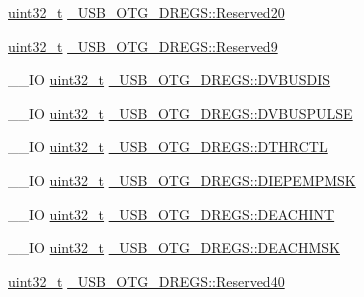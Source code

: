 \begin{DoxyCompactItemize}
\item 
\hyperlink{stdint_8h_a435d1572bf3f880d55459d9805097f62}{uint32\-\_\-t} \hyperlink{group___u_s_b___o_t_g___d_r_i_v_e_r_gaced158adced10fd701d0f38a199029c9}{\-\_\-\-U\-S\-B\-\_\-\-O\-T\-G\-\_\-\-D\-R\-E\-G\-S\-::\-Reserved20}
\item 
\hyperlink{stdint_8h_a435d1572bf3f880d55459d9805097f62}{uint32\-\_\-t} \hyperlink{group___u_s_b___o_t_g___d_r_i_v_e_r_gaa9a82782dd99d04af4174820c8266bcc}{\-\_\-\-U\-S\-B\-\_\-\-O\-T\-G\-\_\-\-D\-R\-E\-G\-S\-::\-Reserved9}
\item 
\-\_\-\-\_\-\-I\-O \hyperlink{stdint_8h_a435d1572bf3f880d55459d9805097f62}{uint32\-\_\-t} \hyperlink{group___u_s_b___o_t_g___d_r_i_v_e_r_ga818ba565032fe67ebe18f4e97ce4b379}{\-\_\-\-U\-S\-B\-\_\-\-O\-T\-G\-\_\-\-D\-R\-E\-G\-S\-::\-D\-V\-B\-U\-S\-D\-I\-S}
\item 
\-\_\-\-\_\-\-I\-O \hyperlink{stdint_8h_a435d1572bf3f880d55459d9805097f62}{uint32\-\_\-t} \hyperlink{group___u_s_b___o_t_g___d_r_i_v_e_r_gac962d74d4a9c6a4e0741c0b0854d9c09}{\-\_\-\-U\-S\-B\-\_\-\-O\-T\-G\-\_\-\-D\-R\-E\-G\-S\-::\-D\-V\-B\-U\-S\-P\-U\-L\-S\-E}
\item 
\-\_\-\-\_\-\-I\-O \hyperlink{stdint_8h_a435d1572bf3f880d55459d9805097f62}{uint32\-\_\-t} \hyperlink{group___u_s_b___o_t_g___d_r_i_v_e_r_ga1e35964a6faafc7b32069468c2140b83}{\-\_\-\-U\-S\-B\-\_\-\-O\-T\-G\-\_\-\-D\-R\-E\-G\-S\-::\-D\-T\-H\-R\-C\-T\-L}
\item 
\-\_\-\-\_\-\-I\-O \hyperlink{stdint_8h_a435d1572bf3f880d55459d9805097f62}{uint32\-\_\-t} \hyperlink{group___u_s_b___o_t_g___d_r_i_v_e_r_ga1b0e55a0d059e5599c3b52a83837d23c}{\-\_\-\-U\-S\-B\-\_\-\-O\-T\-G\-\_\-\-D\-R\-E\-G\-S\-::\-D\-I\-E\-P\-E\-M\-P\-M\-S\-K}
\item 
\-\_\-\-\_\-\-I\-O \hyperlink{stdint_8h_a435d1572bf3f880d55459d9805097f62}{uint32\-\_\-t} \hyperlink{group___u_s_b___o_t_g___d_r_i_v_e_r_gac894147dea343b811bc36b01352bcb7e}{\-\_\-\-U\-S\-B\-\_\-\-O\-T\-G\-\_\-\-D\-R\-E\-G\-S\-::\-D\-E\-A\-C\-H\-I\-N\-T}
\item 
\-\_\-\-\_\-\-I\-O \hyperlink{stdint_8h_a435d1572bf3f880d55459d9805097f62}{uint32\-\_\-t} \hyperlink{group___u_s_b___o_t_g___d_r_i_v_e_r_gafbfda0018492bfa9924e689185d95c58}{\-\_\-\-U\-S\-B\-\_\-\-O\-T\-G\-\_\-\-D\-R\-E\-G\-S\-::\-D\-E\-A\-C\-H\-M\-S\-K}
\item 
\hyperlink{stdint_8h_a435d1572bf3f880d55459d9805097f62}{uint32\-\_\-t} \hyperlink{group___u_s_b___o_t_g___d_r_i_v_e_r_ga8a2302582774c40c9890b85f3244c02f}{\-\_\-\-U\-S\-B\-\_\-\-O\-T\-G\-\_\-\-D\-R\-E\-G\-S\-::\-Reserved40}

\end{DoxyCompactItemize}

